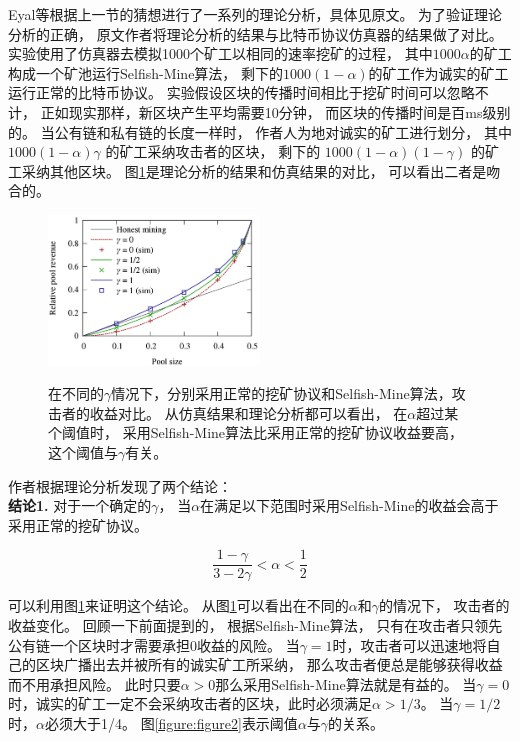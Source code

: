 \documentclass[a4paper, 11pt]{article}
\begin{document}
\begin{CJK*}{UTF8}{gbsn}
    Eyal等根据上一节的猜想进行了一系列的理论分析，具体见原文\cite{ref_selfish_mining1}。
    为了验证理论分析的正确，
    原文作者将理论分析的结果与比特币协议仿真器的结果做了对比。
    实验使用了仿真器去模拟1000个矿工以相同的速率挖矿的过程，
    其中$1000\alpha$的矿工构成一个矿池运行Selfish-Mine算法，
    剩下的$1000(1-\alpha)$的矿工作为诚实的矿工运行正常的比特币协议。
    实验假设区块的传播时间相比于挖矿时间可以忽略不计，
    正如现实那样，新区块产生平均需要10分钟，
    而区块的传播时间是百ms级别的。
    当公有链和私有链的长度一样时，
    作者人为地对诚实的矿工进行划分，
    其中 $1000(1-\alpha)\gamma$ 的矿工采纳攻击者的区块，
    剩下的 $1000(1-\alpha)(1-\gamma)$ 的矿工采纳其他区块。
    图\ref{figure:figure1}是理论分析的结果和仿真结果的对比，
    可以看出二者是吻合的。

    \begin{figure}[h]
        \centering
        \includegraphics[width=0.5\textwidth]{figure1}
        \label{figure:figure1}
        \caption{在不同的$\gamma$情况下，分别采用正常的挖矿协议和Selfish-Mine算法，攻击者的收益对比。
        从仿真结果和理论分析都可以看出，
        在$\alpha$超过某个阈值时，
        采用Selfish-Mine算法比采用正常的挖矿协议收益要高，
        这个阈值与$\gamma$有关。}
    \end{figure}

    作者根据理论分析发现了两个结论：\\

    \textbf{结论1.} 对于一个确定的$\gamma$，
    当$\alpha$在满足以下范围时采用Selfish-Mine的收益会高于采用正常的挖矿协议。

    \begin{equation}
        \frac{1-\gamma}{3-2\gamma} < \alpha < \frac{1}{2}
    \end{equation}

    可以利用图\ref{figure:figure1}来证明这个结论。
    从图\ref{figure:figure1}可以看出在不同的$\alpha$和$\gamma$的情况下，
    攻击者的收益变化。
    回顾一下前面提到的，
    根据Selfish-Mine算法，
    只有在攻击者只领先公有链一个区块时才需要承担0收益的风险。
    当$\gamma = 1$时，攻击者可以迅速地将自己的区块广播出去并被所有的诚实矿工所采纳，
    那么攻击者便总是能够获得收益而不用承担风险。
    此时只要$\alpha > 0$那么采用Selfish-Mine算法就是有益的。
    当$\gamma = 0$时，诚实的矿工一定不会采纳攻击者的区块，此时必须满足$\alpha > 1/3$。
    当$\gamma = 1/2$时，$\alpha$必须大于1/4。
    图\ref{figure:figure2}表示阈值$\alpha$与$\gamma$的关系。\\


\end{CJK*}
\end{document}
